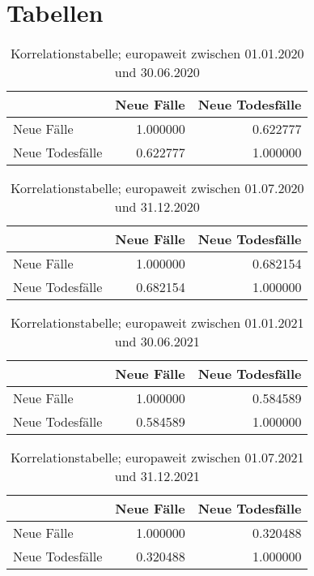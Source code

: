 \chapter{Tabellen}
\label{app:tabellen}


\begin{table}[ht!]
    \centering
    \begin{tabular} {l | r r}
        & Neue Fälle & Neue Todesfälle \\
        \hline
        Neue Fälle & 1.000000 & 0.622777 \\
        Neue Todesfälle & 0.622777 & 1.000000 \\
    \end{tabular}
    \caption{Korrelationstabelle; europaweit zwischen 01.01.2020 und 30.06.2020}
    \label{tab:corr_wave1}
\end{table}

\begin{table}[ht!]
    \centering
    \begin{tabular} {l | r r}
        & Neue Fälle & Neue Todesfälle \\
        \hline
        Neue Fälle & 1.000000 & 0.682154 \\
        Neue Todesfälle & 0.682154 & 1.000000 \\
    \end{tabular}
    \caption{Korrelationstabelle; europaweit zwischen 01.07.2020 und 31.12.2020}
    \label{tab:corr_wave2-1}
\end{table}

\begin{table}[ht!]
    \centering
    \begin{tabular} {l | r r}
        & Neue Fälle & Neue Todesfälle \\
        \hline
        Neue Fälle & 1.000000 & 0.584589 \\
        Neue Todesfälle & 0.584589 & 1.000000 \\
    \end{tabular}
    \caption{Korrelationstabelle; europaweit zwischen 01.01.2021 und 30.06.2021}
    \label{tab:corr_wave2-2}
\end{table}

\begin{table}[ht!]
    \centering
    \begin{tabular} {l | r r}
        & Neue Fälle & Neue Todesfälle \\
        \hline
        Neue Fälle & 1.000000 & 0.320488 \\
        Neue Todesfälle & 0.320488 & 1.000000 \\
    \end{tabular}
    \caption{Korrelationstabelle; europaweit zwischen 01.07.2021 und 31.12.2021}
    \label{tab:corr_wave3-1}
\end{table}


